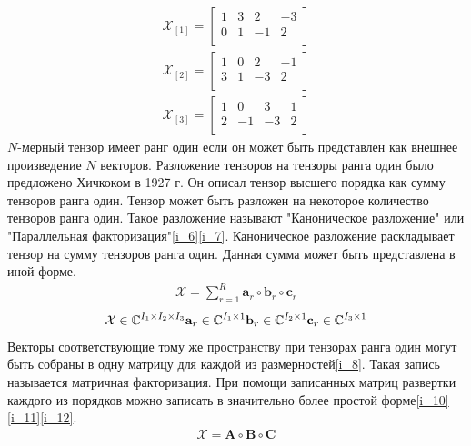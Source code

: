 \begin{align}
\mathcal{X}_{[1]}=\begin{bmatrix}
1&3&2&-3\\ 
0&1&-1&2\\
\end{bmatrix}
\label{i_3}
\end{align}
\begin{align}
\mathcal{X}_{[2]}=\begin{bmatrix}
1&0&2&-1\\ 
3&1&-3&2\\
\end{bmatrix}
\label{i_4}
\end{align}
\begin{align}
\mathcal{X}_{[3]}=\begin{bmatrix}
1&0&3&1\\ 
2&-1&-3&2\\
\end{bmatrix}
\label{i_5}
\end{align}
$N$-мерный тензор имеет ранг один если он может быть представлен как внешнее произведение $N$ векторов\cite{Book6}. Разложение тензоров на тензоры ранга один было предложено Хичкоком в 1927 г\cite{Book5}. Он описал тензор высшего порядка как сумму тензоров ранга один. Тензор может быть разложен на некоторое количество тензоров ранга один. Такое разложение называют "Каноническое разложение" или "Параллельная факторизация"\eqref{i_6}\eqref{i_7}. Каноническое разложение раскладывает тензор на сумму тензоров ранга один. Данная сумма может быть представлена в иной форме.
\begin{align}
\mathcal{X}=\sum_{r=1}^R \mathbf{a}_r \circ \mathbf{b}_r \circ \mathbf{c}_r
\label{i_6}
\end{align}
\begin{align}
\mathcal{X}\in \mathbb{C}^{I_1\times I_2\times I_3} \mathbf{a}_r\in \mathbb{C}^{I_1\times 1} \mathbf{b}_r\in \mathbb{C}^{I_2\times 1} \mathbf{c}_r\in \mathbb{C}^{I_3\times 1}
\label{i_7}
\end{align} 
Векторы соответствующие тому же пространству при тензорах ранга один могут быть собраны в одну матрицу для каждой из размерностей\eqref{i_8}. Такая запись называется матричная факторизация. При помощи записанных матриц развертки каждого из порядков можно записать в значительно более простой форме\eqref{i_10}\eqref{i_11}\eqref{i_12}. 
\begin{align}
\mathcal{X}= \mathbf{A} \circ \mathbf{B} \circ \mathbf{C}
\label{i_8}
\end{align}
